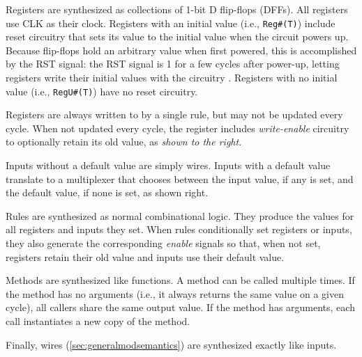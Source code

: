 Registers are synthesized as collections of 1-bit D flip-flops (DFFs).
All registers use CLK as their clock.
Registers with an initial value (i.e., \verb|Reg#(T)|) include reset circuitry
that sets its value to the initial value when the circuit powers up.
Because flip-flops hold an arbitrary value when first powered, this is accomplished by
the RST signal: the RST signal is 1 for a few cycles after power-up,
letting registers write their initial values with the circuitry .
Registers with no initial value (i.e., \verb|RegU#(T)|) have no reset circuitry.

Registers are always written to by a single rule, but may not be updated every cycle.
When not updated every cycle, the register includes \emph{write-enable} circuitry
to optionally retain its old value, as \emph{shown to the right}.


Inputs without a default value are simply wires.
Inputs with a default value translate to a multiplexer that chooses between
the input value, if any is set, and the default value, if none is set, as shown right.

Rules are synthesized as normal combinational logic.
They produce the values for all registers and inputs they set.
When rules conditionally set registers or inputs,
they also generate the corresponding \emph{enable} signals
so that, when not set, registers retain their old value
and inputs use their default value.

Methods are synthesized like functions.
A method can be called multiple times. If the method has no arguments
(i.e., it always returns the same value on a given cycle),
all callers share the same output value. If the method has arguments,
each call instantiates a new copy of the method.

Finally, wires (\autoref{sec:generalmodsemantics})
are synthesized exactly like inputs.

